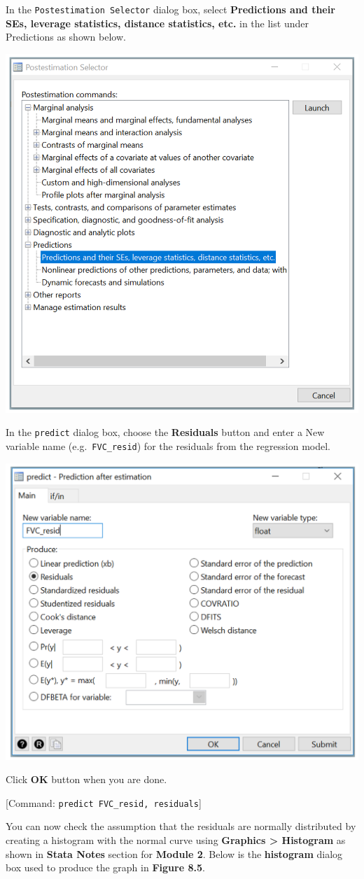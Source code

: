 \documentclass[
]{memoir}
\begin{document}
In the \texttt{Postestimation\ Selector} dialog box, select \textbf{Predictions and their SEs, leverage statistics, distance statistics, etc.} in the list under Predictions as shown below.

\includegraphics[width=0.66\linewidth]{img/mod08/stata/postest-1}

In the \texttt{predict} dialog box, choose the \textbf{Residuals} button and enter a New variable name (e.g.~\texttt{FVC\_resid}) for the residuals from the regression model.

\includegraphics[width=0.66\linewidth]{img/mod08/stata/postest-2}

Click \textbf{OK} button when you are done.

{[}Command: \texttt{predict\ FVC\_resid,\ residuals}{]}

You can now check the assumption that the residuals are normally distributed by creating a histogram with the normal curve using \textbf{Graphics \textgreater{} Histogram} as shown in \textbf{Stata Notes} section for \textbf{Module 2}. Below is the \textbf{histogram} dialog box used to produce the graph in \textbf{Figure 8.5}.
\end{document}
